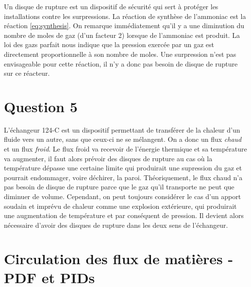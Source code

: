 \documentclass[a4paper,oneside,12pt]{article}
\begin{document}
Un disque de rupture est un dispositif de sécurité qui sert à protéger les installations 
contre les surpressions.
La réaction de synthèse de l'ammoniac est la réaction \ref{eq:synthesis}.
On remarque immédiatement qu'il y a une diminution du nombre de moles de gaz (d'un facteur 2) 
lorsque de l'ammoniac est produit. La loi des gazs parfait nous indique que la pression
exercée par un gaz est directement proportionnelle à son nombre de moles.
Une surpression n'est pas envisageable pour cette réaction, 
il n'y a donc pas besoin de disque de rupture sur ce réacteur.

\section*{Question 5}

L'échangeur 124-C est un dispositif permettant de transférer de la chaleur d'un fluide
vers un autre, sans que ceux-ci ne se mélangent.
On a donc un flux \emph{chaud} et un flux \emph{froid}. Le flux froid va recevoir de 
l'énergie thermique et sa température va augmenter, il faut alors prévoir des disques 
de rupture au cas où la température dépasse une certaine limite qui produirait une 
supression du gaz et pourrait endommager, voire déchirer, la paroi.
Théoriquement, le flux chaud n'a pas besoin de disque de rupture parce que le gaz qu'il 
transporte ne peut que diminuer de volume. Cependant, on peut toujours considérer le cas
d'un apport soudain et imprévu de chaleur comme une explosion extérieure, qui produirait
une augmentation de température et par conséquent de pression. 
Il devient alors nécessaire d'avoir des disques de rupture dans les deux sens de l'échangeur.


\appendix
\section{Circulation des flux de matières - PDF et PIDs}
\label{ann:fluxes}
\end{document}
